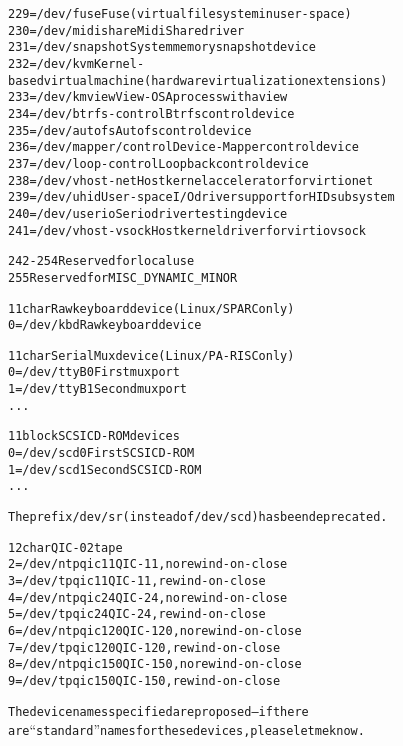 \documentclass[a4paper,8pt,english]{sphinxmanual}
\begin{document}
\begin{alltt}
                229 = /dev/fuse         Fuse (virtual filesystem in user-space)
                230 = /dev/midishare    MidiShare driver
                231 = /dev/snapshot     System memory snapshot device
                232 = /dev/kvm          Kernel-based virtual machine (hardware virtualization extensions)
                233 = /dev/kmview       View-OS A process with a view
                234 = /dev/btrfs-control        Btrfs control device
                235 = /dev/autofs       Autofs control device
                236 = /dev/mapper/control       Device-Mapper control device
                237 = /dev/loop-control Loopback control device
                238 = /dev/vhost-net    Host kernel accelerator for virtio net
                239 = /dev/uhid         User-space I/O driver support for HID subsystem
                240 = /dev/userio       Serio driver testing device
                241 = /dev/vhost-vsock  Host kernel driver for virtio vsock

                242-254                 Reserved for local use
                255                     Reserved for MISC\_DYNAMIC\_MINOR

  11 char       Raw keyboard device     (Linux/SPARC only)
                  0 = /dev/kbd          Raw keyboard device

  11 char       Serial Mux device       (Linux/PA-RISC only)
                  0 = /dev/ttyB0        First mux port
                  1 = /dev/ttyB1        Second mux port
                    ...

  11 block      SCSI CD-ROM devices
                  0 = /dev/scd0         First SCSI CD-ROM
                  1 = /dev/scd1         Second SCSI CD-ROM
                    ...

                The prefix /dev/sr (instead of /dev/scd) has been deprecated.

  12 char       QIC-02 tape
                  2 = /dev/ntpqic11     QIC-11, no rewind-on-close
                  3 = /dev/tpqic11      QIC-11, rewind-on-close
                  4 = /dev/ntpqic24     QIC-24, no rewind-on-close
                  5 = /dev/tpqic24      QIC-24, rewind-on-close
                  6 = /dev/ntpqic120    QIC-120, no rewind-on-close
                  7 = /dev/tpqic120     QIC-120, rewind-on-close
                  8 = /dev/ntpqic150    QIC-150, no rewind-on-close
                  9 = /dev/tpqic150     QIC-150, rewind-on-close

                The device names specified are proposed -- if there
                are ``standard'' names for these devices, please let me know.


\end{alltt}
\end{document}
